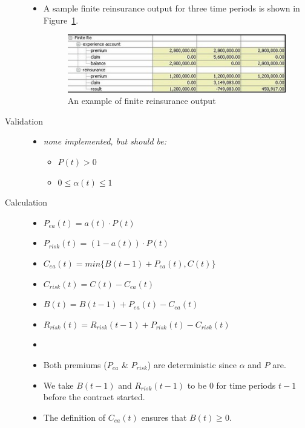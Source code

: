 \begin{description}
\begin{itemize}
			\item[] A sample finite reinsurance output for three time periods is shown in Figure~\ref{fig:FiniteReOutput}.
			\begin{figure}
				\centering
					\includegraphics{images/FiniteReOutput.png}
				\caption{An example of finite reinsurance output}
				\label{fig:FiniteReOutput}
			\end{figure}
		\end{itemize}
	\item[Validation] \hfill
		\begin{itemize}%
			\item[] \emph{none implemented, but should be:}
			\begin{itemize}%
				\item[] $P(t)>0$
				\item[] $0 \leq \alpha(t) \leq 1$
			\end{itemize}
		\end{itemize}
	\item[Calculation] \hfill
		\begin{itemize}%
			\item $P_{ea}(t) = a(t) \cdot P(t)$
			\item $P_{risk}(t) = (1 - a(t)) \cdot P(t)$
			\item $C_{ea}(t) = min\{B(t-1) + P_{ea}(t), C(t)\}$
			\item $C_{risk}(t) = C(t) - C_{ea}(t)$
			\item $B(t) = B(t-1) + P_{ea}(t) - C_{ea}(t)$
			\item $R_{risk}(t) = R_{risk}(t-1) + P_{risk}(t) - C_{risk}(t)$
			\item[] \note{}
			\item[] Both premiums ($P_{ea}$ \& $P_{risk}$) are deterministic since $\alpha$ and $P$ are.
			\item[] We take $B(t-1)$ and $R_{risk}(t-1)$ to be $0$ for time periods $t-1$ before the contract started.
			\item[] The definition of $C_{ea}(t)$ ensures that $B(t) \geq 0$.
		\end{itemize}
\end{description}


